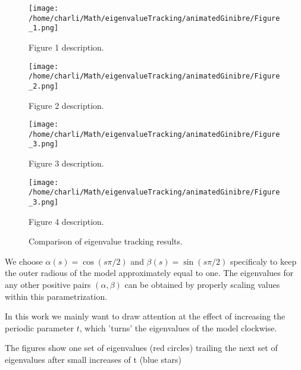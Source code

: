 \documentclass{article}
\begin{document}
	\begin{figure}[htbp]
		\centering
		\begin{minipage}[b]{0.48\textwidth}
			\centering
			\texttt{[image: /home/charli/Math/eigenvalueTracking/animatedGinibre/Figure\_1.png]}
			\caption{Figure 1 description.}
		\end{minipage}
		\hfill
		\begin{minipage}[b]{0.48\textwidth}
			\centering
			\texttt{[image: /home/charli/Math/eigenvalueTracking/animatedGinibre/Figure\_2.png]}
			\caption{Figure 2 description.}
		\end{minipage}
	
		\vspace{0.5cm}
		\begin{minipage}[b]{0.48\textwidth}
			\centering
			\texttt{[image: /home/charli/Math/eigenvalueTracking/animatedGinibre/Figure\_3.png]}
			\caption{Figure 3 description.}
		\end{minipage}
		\hfill
		\begin{minipage}[b]{0.48\textwidth}
			\centering
			\texttt{[image: /home/charli/Math/eigenvalueTracking/animatedGinibre/Figure\_3.png]}
			\caption{Figure 4 description.}
		\end{minipage}
	
		\caption{Comparison of eigenvalue tracking results.}
		\label{fig:comparison_2x2}
	\end{figure}
	

	We choose $\alpha(s) = \cos(s \pi /2)$ and $\beta(s) = \sin(s \pi /2)$ 
	specificaly to keep the outer radious of the model approximately equal to one. 
	The eigenvalues for any other positive pairs $(\alpha, \beta)$ can be obtained 
	by properly scaling values within this parametrization.
	
	In this work we mainly want to draw attention at the effect of increasing 
	the periodic parameter $t$,
	which 'turns' the eigenvalues of the model clockwise.

	The figures show one set of eigenvalues (red circles) 
	trailing the next set of eigenvalues 
 	after small increases of t (blue stars)
\end{document}
